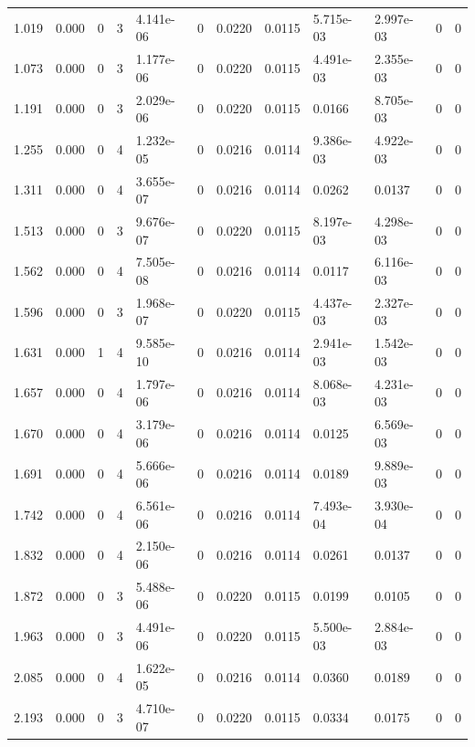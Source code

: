 \documentclass[preview]{standalone}
\begin{document}
{{\begin{tabular}{L{1.2cm}C{1.2cm} C{0.3cm}C{0.5cm} C{1.4cm}C{1.4cm} C{1.4cm}C{1.4cm} C{1.6cm}C{1.6cm} C{1.6cm}C{1.6cm}}
  1.019  &  0.000  & 0     &  3 &  4.141e-06  & 0  &  0.0220&   0.0115& 5.715e-03 & 2.997e-03   &  0 & 0  \\ 
  1.073  &  0.000  & 0     &  3 &  1.177e-06  & 0  &  0.0220&   0.0115& 4.491e-03 & 2.355e-03   &  0 & 0  \\ 
  1.191  &  0.000  & 0     &  3 &  2.029e-06  & 0  &  0.0220&   0.0115& 0.0166 & 8.705e-03   &  0 & 0  \\ 
  1.255  &  0.000  & 0     &  4 &  1.232e-05  & 0  &  0.0216&   0.0114& 9.386e-03 & 4.922e-03   &  0 & 0  \\ 
  1.311  &  0.000  & 0     &  4 &  3.655e-07  & 0  &  0.0216&   0.0114& 0.0262 & 0.0137   &  0 & 0  \\ 
  1.513  &  0.000  & 0     &  3 &  9.676e-07  & 0  &  0.0220&   0.0115& 8.197e-03 & 4.298e-03   &  0 & 0  \\ 
  1.562  &  0.000  & 0     &  4 &  7.505e-08  & 0  &  0.0216&   0.0114& 0.0117 & 6.116e-03   &  0 & 0  \\ 
  1.596  &  0.000  & 0     &  3 &  1.968e-07  & 0  &  0.0220&   0.0115& 4.437e-03 & 2.327e-03   &  0 & 0  \\ 
  1.631  &  0.000  & 1     &  4 &  9.585e-10  & 0  &  0.0216&   0.0114& 2.941e-03 & 1.542e-03   &  0 & 0  \\ 
  1.657  &  0.000  & 0     &  4 &  1.797e-06  & 0  &  0.0216&   0.0114& 8.068e-03 & 4.231e-03   &  0 & 0  \\ 
  1.670  &  0.000  & 0     &  4 &  3.179e-06  & 0  &  0.0216&   0.0114& 0.0125 & 6.569e-03   &  0 & 0  \\ 
  1.691  &  0.000  & 0     &  4 &  5.666e-06  & 0  &  0.0216&   0.0114& 0.0189 & 9.889e-03   &  0 & 0  \\ 
  1.742  &  0.000  & 0     &  4 &  6.561e-06  & 0  &  0.0216&   0.0114& 7.493e-04 & 3.930e-04   &  0 & 0  \\ 
  1.832  &  0.000  & 0     &  4 &  2.150e-06  & 0  &  0.0216&   0.0114& 0.0261 & 0.0137   &  0 & 0  \\ 
  1.872  &  0.000  & 0     &  3 &  5.488e-06  & 0  &  0.0220&   0.0115& 0.0199 & 0.0105   &  0 & 0  \\ 
  1.963  &  0.000  & 0     &  3 &  4.491e-06  & 0  &  0.0220&   0.0115& 5.500e-03 & 2.884e-03   &  0 & 0  \\ 
  2.085  &  0.000  & 0     &  4 &  1.622e-05  & 0  &  0.0216&   0.0114& 0.0360 & 0.0189   &  0 & 0  \\ 
  2.193  &  0.000  & 0     &  3 &  4.710e-07  & 0  &  0.0220&   0.0115& 0.0334 & 0.0175   &  0 & 0  \\ 

\end{tabular}}}
\end{document}
